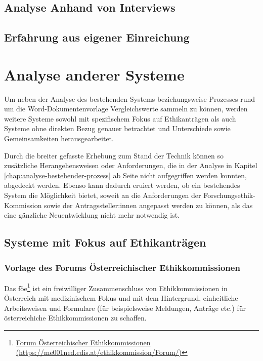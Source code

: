 \section{Analyse Anhand von Interviews}

\section{Erfahrung aus eigener Einreichung}

\chapter{Analyse anderer Systeme}
\label{chap:analyse-anderer-systeme}

Um neben der Analyse des bestehenden Systems beziehungsweise Prozesses rund um die Word-Dokumentenvorlage Vergleichswerte sammeln zu können, werden weitere Systeme sowohl mit spezifischem Fokus auf Ethikanträgen als auch Systeme ohne direkten Bezug genauer betrachtet und Unterschiede sowie Gemeinsamkeiten herausgearbeitet.

Durch die breiter gefasste Erhebung zum Stand der Technik können so zusätzliche Herangehensweisen oder Anforderungen, die in der Analyse in Kapitel \ref{chap:analyse-bestehender-prozess} ab Seite \pageref{chap:analyse-anderer-systeme} nicht aufgegriffen werden konnten, abgedeckt werden. Ebenso kann dadurch eruiert werden, ob ein bestehendes System die Möglichkeit bietet, soweit an die Anforderungen der Forschungsethik-Kommission sowie der Antragssteller:innen angepasst werden zu können, als das eine gänzliche Neuentwicklung nicht mehr notwendig ist.

\section{Systeme mit Fokus auf Ethikanträgen}
\label{sec:systeme-mit-fokkus-ethikantrage}

\subsection{Vorlage des Forums Österreichischer Ethikkommissionen}
\label{sub-sec:vorlage-föe}

Das \ac{föe}\footnote{\href{https://me001ned.edis.at/ethikkommission/Forum/index.htm}{Forum Österreichischer Ethikkommissionen (\url{https://me001ned.edis.at/ethikkommission/Forum/)}}} ist ein freiwilliger Zusammenschluss von Ethikkommissionen in Österreich mit medizinischem Fokus und mit dem Hintergrund, einheitliche Arbeitsweisen und Formulare (für beispielsweise Meldungen, Anträge etc.) für österreichiche Ethikkommissionen zu schaffen.\cite{ethikkommission_der_medizinischen_universitat_graz_forum_2019}

